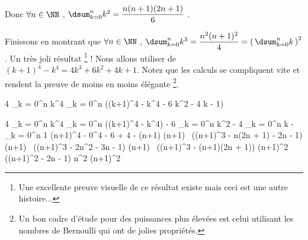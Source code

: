 \medskip

Donc
$\forall n \in \NN$ , $\dsum_{k = 0}^{n} k^2 = \dfrac{n(n + 1)(2n + 1)}{6}$ .


\medskip

Finissons en montrant que
$\forall n \in \NN$ , $\dsum_{k = 0}^{n} k^3 = \dfrac{n^2 (n + 1)^2}{4} = \left( \, \dsum_{k = 0}^{n} k \, \right)^2$ . Un très joli résultat
\footnote{
	Une excellente preuve visuelle de ce résultat existe mais ceci est une autre histoire...
} !
Nous allons utiliser de $(k+1)^4 - k^4 = 4 k^3 + 6 k^2 + 4 k + 1$.
Notez que les calculs se compliquent vite et rendent la preuve de moins en moins élégante
\footnote{
	Un bon cadre d'étude pour des puissances plus élevées est celui utilisant les nombres de Bernoulli qui ont de jolies propriétés.
}.

\medskip

\begin{explain}[style = sar]
	4 \dsum_{k = 0}^{n} k^4
		\explnext{}
	\dsum_{k = 0}^{n} ((k+1)^4 - k^4 - 6 k^2 - 4 k - 1)
\end{explain}

\begin{explain}[style = sar]
	4 \dsum_{k = 0}^{n} k^4
		\explnext{}
	\dsum_{k = 0}^{n} ((k+1)^4 - k^4) - 6 \dsum_{k = 0}^{n} k^2 - 4 \dsum_{k = 0}^{n} k - \dsum_{k = 0}^{n} 1
		\explnext{}
	(n+1)^4 - 0^4 - 6 \cdot {} + 4 \cdot {} - (n+1)
		\explnext{}
	(n+1) \, ((n+1)^3 - n(2n + 1) - 2n - 1)
		\explnext{}
	(n+1) \, ((n+1)^3 - 2n^2 - 3n - 1)
	(n+1) \, ((n+1)^3 - (n+1)(2n + 1))
		\explnext{}
	(n+1)^2 \, ((n+1)^2 - 2n - 1)
		\explnext{}
	n^2 (n+1)^2
\end{explain}



